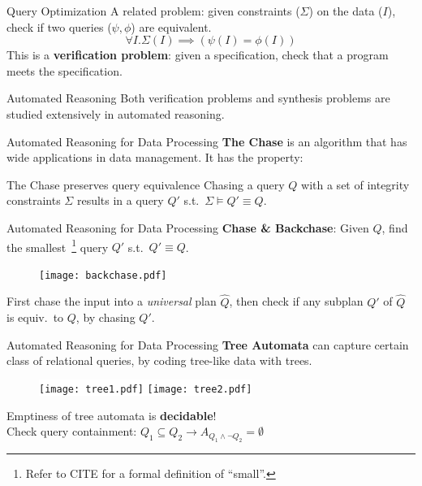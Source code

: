 \documentclass{beamer}
\begin{document}
  \begin{frame}{Query Optimization}
    A related problem: given constraints ($\Sigma$) on the data ($I$), 
    check if two queries ($\psi, \phi$) are equivalent.
    \[\forall I . \Sigma(I) \implies (\psi(I) = \phi(I)) \] \pause
    This is a \textbf{verification problem}:
    given a specification, check that a program meets the specification.
  \end{frame}

  \begin{frame}{Automated Reasoning}
    Both verification problems and synthesis problems are studied 
    extensively in automated reasoning.
  \end{frame}

  \begin{frame}{Automated Reasoning for Data Processing}
    \textbf{The Chase} is an algorithm that has wide applications 
    in data management. It has the property:
    \begin{alertblock}{The Chase preserves query equivalence}
      Chasing a query $Q$ with a set of integrity constraints $\Sigma$
      results in a query $Q'$ s.t.~$\Sigma \models Q'\equiv Q$.
    \end{alertblock}
  \end{frame}

  \begin{frame}{Automated Reasoning for Data Processing}
    \textbf{Chase \& Backchase}: Given $Q$, find the smallest~\footnote{
      Refer to CITE for a formal definition of ``small''.
    }
    query $Q'$ s.t.~$Q'\equiv Q$.
    \begin{figure}
      \texttt{[image: backchase.pdf]}
    \end{figure}
    First chase the input into a {\em universal} plan $\hat Q$, \pause 
    then check if any subplan $Q'$ of $\hat Q$ is equiv.~to $Q$,
    by chasing $Q'$.
  \end{frame}

  \begin{frame}{Automated Reasoning for Data Processing}
    \textbf{Tree Automata} can capture certain class of
    relational queries, by coding tree-like data with trees.
    \begin{figure}
      \colorbox{white}{
      \texttt{[image: tree1.pdf]}
      \hspace{1cm}
      \texttt{[image: tree2.pdf]}}
    \end{figure}
    \pause
    Emptiness of tree automata is \textbf{decidable}! \\
    Check query containment: 
    $Q_1 \subseteq Q_2 \rightarrow A_{Q_1 \wedge \neg Q_2} = \emptyset$
  \end{frame}
\end{document}
